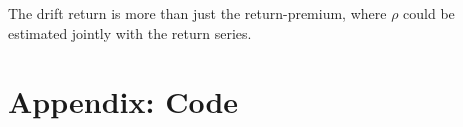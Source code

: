 \documentclass[11pt,reqno,final]{amsart}
\begin{document}
The drift return is more than just the return-premium, where $\rho$ could be estimated jointly with the return series. 

%
%


%
%
\newpage
\section*{Appendix: Code}
%
\end{document}
